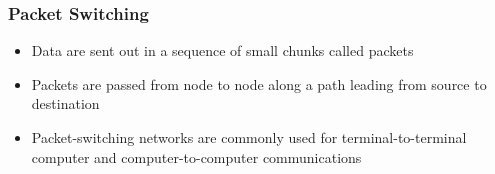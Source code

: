 \documentclass[pdflatex,compress]{beamer}
\begin{document}
\begin{frame}
	\frametitle{Packet Switching}
	\begin{itemize}
		\item Data are sent out in a sequence of small chunks called packets
		\item Packets are passed from node to node along a path leading from source to destination
		\item Packet-switching networks are commonly used for terminal-to-terminal computer and computer-to-computer communications
	\end{itemize}
\end{frame}
\end{document}

